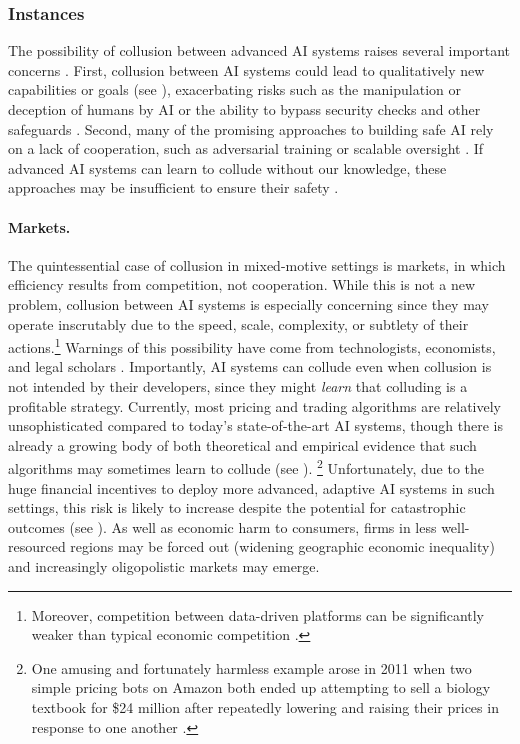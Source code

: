 \subsubsection{Instances}

The possibility of collusion between advanced AI systems raises several important concerns \citep{Drexler2022}.
First, collusion between AI systems could lead to qualitatively new capabilities or goals (see ), exacerbating risks such as the manipulation or deception of humans by AI \citep{Park2023,Evans2021} or the ability to bypass security checks and other safeguards \citep{OpenAI2023,Jones2024}.
Second, many of the promising approaches to building safe AI rely on a lack of cooperation, such as adversarial training \citep{Huang2011,Ziegler2022,Perez2022} or scalable oversight \citep{Irving2018,Christiano2018a,elk_report_2021,Greenblatt2023,Leike2018}.
If advanced AI systems can learn to collude without our knowledge, these approaches may be insufficient to ensure their safety \citep[see also ]{Goel2025}.

\paragraph{Markets.}
The quintessential case of collusion in mixed-motive settings is {markets}, in which efficiency results from competition, not cooperation.
While this is not a new problem, collusion between AI systems is especially concerning since they may operate inscrutably due to the speed, scale, complexity, or subtlety of their actions.\footnote{Moreover, competition between data-driven platforms can be significantly weaker than typical economic competition \citep{Jagadeesan2023}.} 
Warnings of this possibility have come from technologists, economists, and legal scholars \citep{Brown2023,Mehra2016,Ezrachi2017,Harrington2019,beneke_artificial_2019}. 
Importantly, AI systems can collude even when collusion is not intended by their developers, since they might \emph{learn} that colluding is a profitable strategy.
Currently, most pricing and trading algorithms are relatively unsophisticated compared to today's state-of-the-art AI systems, though there is already a growing body of both theoretical \citep{Brown2023} and empirical \citep{Assad2020German,Wieting2021,Calvano2019,Klein2021Autonomous,Abada2023} evidence that such algorithms may sometimes learn to collude (see ).%
\footnote{One amusing and fortunately harmless example arose in 2011 when two simple pricing bots on Amazon both ended up attempting to sell a biology textbook for \$24 million after repeatedly lowering and raising their prices in response to one another \citep{Solon_2011}.\label{fn:textbook}}
Unfortunately, due to the huge financial incentives to deploy more advanced, adaptive AI systems in such settings, this risk is likely to increase despite the potential for catastrophic outcomes (see ).
As well as economic harm to consumers, firms in less well-resourced regions may be forced out (widening geographic economic inequality) and increasingly oligopolistic markets may emerge.

